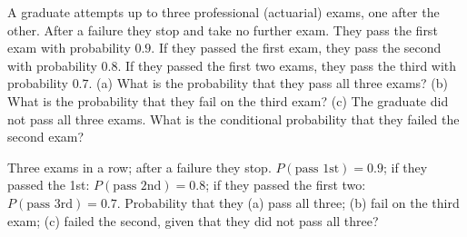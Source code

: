 
\begin{problem}
	A graduate attempts up to three professional (actuarial) exams, one after the other.
	After a failure they stop and take no further exam. They pass the first
	exam with probability $0.9$. If they passed the first exam, they pass the
	second with probability $0.8$. If they passed the first two exams, they pass
	the third with probability $0.7$.
	(a) What is the probability that they pass all three exams?
	(b) What is the probability that they fail on the third exam?
	(c) The graduate did not pass all three exams. What is the conditional
	probability that they failed the second exam?
\end{problem}

\begin{slideproblem}
	Three exams in a row; after a failure they stop. $P(\text{pass 1st})=0.9$;
	if they passed the 1st: $P(\text{pass 2nd})=0.8$; if they passed the first
	two: $P(\text{pass 3rd})=0.7$. Probability that they (a) pass all three;
	(b) fail on the third exam; (c) failed the second, given that they did
	not pass all three?
\end{slideproblem}

